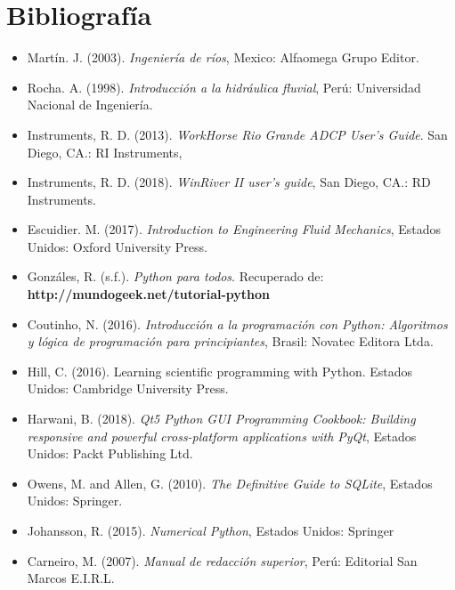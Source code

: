 \documentclass[12pt,a4paper]{report}
\begin{document}
\section{Bibliografía}
\begin{itemize}
	\item Martín. J. (2003). \textit{Ingeniería de ríos}, Mexico: Alfaomega Grupo Editor.
	\item Rocha. A. (1998). \textit{Introducción a la hidráulica fluvial}, Perú: Universidad Nacional de Ingeniería.
	\item Instruments, R. D. (2013). \textit{WorkHorse Rio Grande ADCP User’s Guide}. San Diego, CA.: RI Instruments, 
	\item Instruments, R. D. (2018). \textit{WinRiver II user's guide}, San Diego, CA.: RD Instruments.
	\item Escuidier. M. (2017). \textit{Introduction to Engineering Fluid Mechanics}, Estados Unidos: Oxford University Press.
	\item Gonzáles, R. (s.f.). \textit{Python para todos}. Recuperado de: \textbf{http://mundogeek.net/tutorial-python}
	\item Coutinho, N. (2016). \textit{Introducción a la programación con Python: Algoritmos y lógica de programación para principiantes}, Brasil: Novatec Editora Ltda.
	\item Hill, C. (2016). Learning scientific programming with Python. Estados Unidos: Cambridge University Press.
	\item Harwani, B. (2018). \textit{Qt5 Python GUI Programming Cookbook: Building responsive and powerful cross-platform applications with PyQt}, Estados Unidos: Packt Publishing Ltd.
	\item Owens, M. and Allen, G. (2010). \textit{The Definitive Guide to SQLite}, Estados Unidos: Springer.
	\item Johansson, R. (2015). \textit{Numerical Python}, Estados Unidos: Springer
	\item Carneiro, M. (2007). \textit{Manual de redacción superior}, Perú: Editorial San Marcos E.I.R.L.
\end{itemize}
\end{document}
